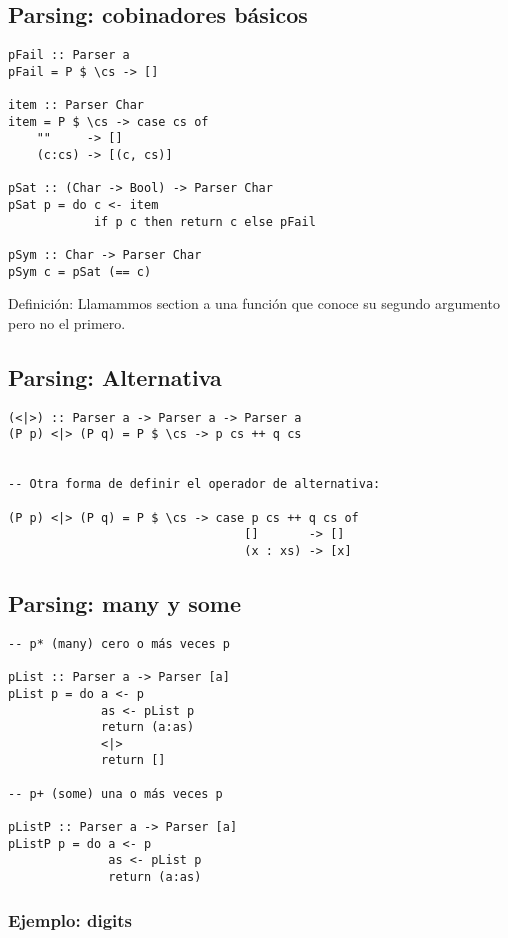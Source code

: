 \documentclass{article}
\newcommand{\imp}[1]{\textcolor{color1}{#1}}
\begin{document}
\subsection{Parsing: cobinadores básicos}

\begin{lstlisting}
pFail :: Parser a
pFail = P $ \cs -> []

item :: Parser Char
item = P $ \cs -> case cs of 
    ""     -> []
    (c:cs) -> [(c, cs)]

pSat :: (Char -> Bool) -> Parser Char
pSat p = do c <- item
            if p c then return c else pFail

pSym :: Char -> Parser Char
pSym c = pSat (== c)
\end{lstlisting}

\imp{Definición}: Llamammos \imp{section} a una función que conoce su segundo argumento pero no el primero.

\subsection{Parsing: Alternativa}

\begin{lstlisting}
(<|>) :: Parser a -> Parser a -> Parser a
(P p) <|> (P q) = P $ \cs -> p cs ++ q cs


-- Otra forma de definir el operador de alternativa:

(P p) <|> (P q) = P $ \cs -> case p cs ++ q cs of
                                 []       -> []
                                 (x : xs) -> [x]
\end{lstlisting}

\newpage

\subsection{Parsing: many y some}

\begin{lstlisting}
-- p* (many) cero o más veces p

pList :: Parser a -> Parser [a]
pList p = do a <- p
             as <- pList p
             return (a:as)
             <|>
             return []

-- p+ (some) una o más veces p

pListP :: Parser a -> Parser [a]
pListP p = do a <- p
              as <- pList p
              return (a:as)
\end{lstlisting}

\subsubsection{Ejemplo: digits}
\end{document}
